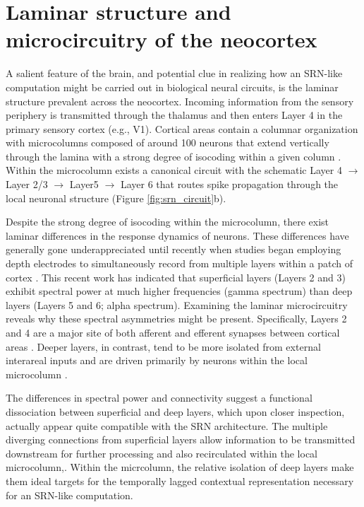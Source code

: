 \documentclass[defaultstyle,12pt]{thesis}
\begin{document}
{\section{Laminar structure and microcircuitry of the neocortex}
A salient feature of the brain, and potential clue in realizing how an SRN-like computation might be carried out in biological neural circuits, is the laminar structure prevalent across the neocortex. Incoming information from the sensory periphery is transmitted through the thalamus and then enters Layer 4 in the primary sensory cortex (e.g., V1). Cortical areas contain a columnar organization with microcolumns composed of around 100 neurons that   extend vertically through the lamina with a strong degree of isocoding within a given column \cite{Mountcastle97,Jones00,HortonAdams05}. Within the microcolumn exists a canonical circuit with the schematic Layer 4  $\rightarrow$ Layer 2/3 $\rightarrow$ Layer5 $\rightarrow$ Layer 6 that routes spike propagation through the local neuronal structure (Figure \ref{fig:srn_circuit}b).

Despite the strong degree of isocoding within the microcolumn, there exist laminar differences in the response dynamics of neurons. These differences have generally gone underappreciated until recently when studies began employing depth electrodes to simultaneously record from multiple layers within a patch of cortex \cite[e.g.,]{MaierAdamsAuraEtAl10,BuffaloFriesLandmanEtAl11,SpaakBonnefondMaierEtAl12}. This recent work has indicated that superficial layers (Layers 2 and 3) exhibit spectral power at much higher frequencies (gamma spectrum) than deep layers (Layers 5 and 6; alpha spectrum). Examining the laminar microcircuitry reveals why these spectral asymmetries might be present. Specifically, Layers 2 and 4 are a major site of both afferent and efferent synapses between cortical areas \cite{RocklandPandya79}. Deeper layers, in contrast, tend to be more isolated from external interareal inputs and are driven primarily by neurons within the local microcolumn \cite{DouglasMartin04,ThomsonLamy07}. 

The differences in spectral power and connectivity suggest a functional dissociation between superficial and deep layers, which upon closer inspection, actually appear quite compatible with the SRN architecture. The multiple diverging connections from superficial layers allow information to be transmitted downstream for further processing and also recirculated within the local microcolumn,. Within the micrcolumn, the relative isolation of deep layers make them ideal targets for the temporally lagged contextual representation necessary for an SRN-like computation.

}
\end{document}
